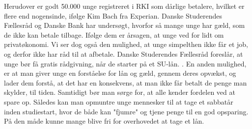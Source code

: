 Herudover er godt 50.000 unge registreret i RKI som dårlige betalere, hvilket er flere end nogensinde, ifølge Kim Bach fra Experian. Danske Studerendes Fællesråd og Danske Bank har undersøgt, hvorfor så mange unge har gæld, som de ikke kan betale tilbage. Ifølge dem er årsagen, at unge ved for lidt om privatøkonomi. Vi ser dog også den mulighed, at unge simpelthen ikke får et job, og derfor ikke har råd til at afbetale. Danske Studerendes Fællesråd foreslår, at unge bør få gratis rådgivning, når de starter på et SU-lån. \cite{dr.dk}. En anden mulighed, er at man giver unge en forståelse for lån og gæld, gennem deres opvækst, og lader dem forstå, at det har en konsekvens, at man ikke får betalt de penge man skylder, til tiden. Samtidigt bør man sørge for, at alle kender fordelen ved at spare op. Således kan man opmuntre unge mennesker til at tage et sabbatår inden studiestart, hvor de både kan "fjumre" og tjene penge til en god opsparing. På den måde kunne mange blive fri for overhovedet at tage et lån.

 